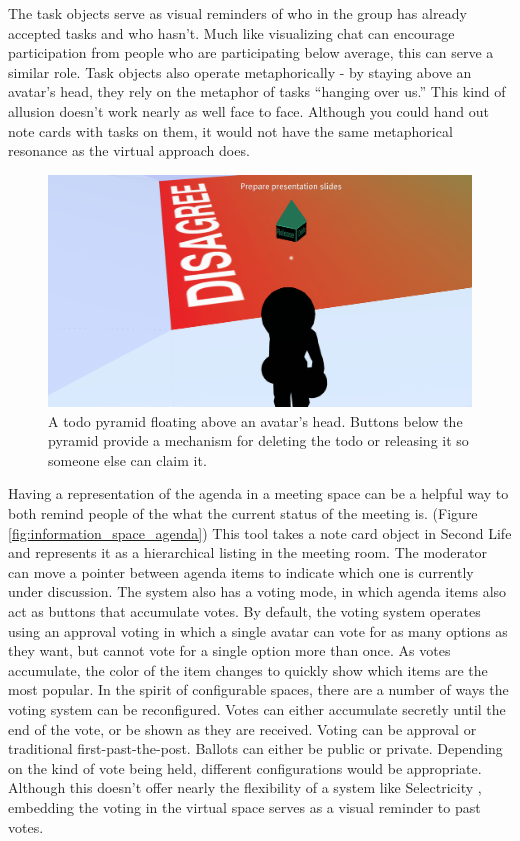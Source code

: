 The task objects serve as visual reminders of who in the group has already accepted tasks and who hasn't. Much like visualizing chat can encourage participation from people who are participating below average, this can serve a similar role. Task objects also operate metaphorically - by staying above an avatar's head, they rely on the metaphor of tasks ``hanging over us.'' \citep{lakoff_metaphors_1980} This kind of allusion doesn't work nearly as well face to face. Although you could hand out note cards with tasks on them, it would not have the same metaphorical resonance as the virtual approach does.


\begin{figure}[tp]
	\includegraphics{figures/todo.png}
	\caption{A todo pyramid floating above an avatar's head. Buttons below the pyramid provide a mechanism for deleting the todo or releasing it so someone else can claim it.}
	\label{fig:information_space_todo}
\end{figure}


Having a representation of the agenda in a meeting space can be a helpful way to both remind people of the what the current status of the meeting is. (Figure \ref{fig:information_space_agenda}) This tool takes a note card object in Second Life and represents it as a hierarchical listing in the meeting room. The moderator can move a pointer between agenda items to indicate which one is currently under discussion. The system also has a voting mode, in which agenda items also act as buttons that accumulate votes. By default, the voting system operates using an approval voting in which a single avatar can vote for as many options as they want, but cannot vote for a single option more than once. As votes accumulate, the color of the item changes to quickly show which items are the most popular. In the spirit of configurable spaces, there are a number of ways the voting system can be reconfigured. Votes can either accumulate secretly until the end of the vote, or be shown as they are received. Voting can be approval or traditional first-past-the-post. Ballots can either be public or private. Depending on the kind of vote being held, different configurations would be appropriate. Although this doesn't offer nearly the flexibility of a system like Selectricity \citep{Hill:2006vw}, embedding the voting in the virtual space serves as a visual reminder to past votes.
 


